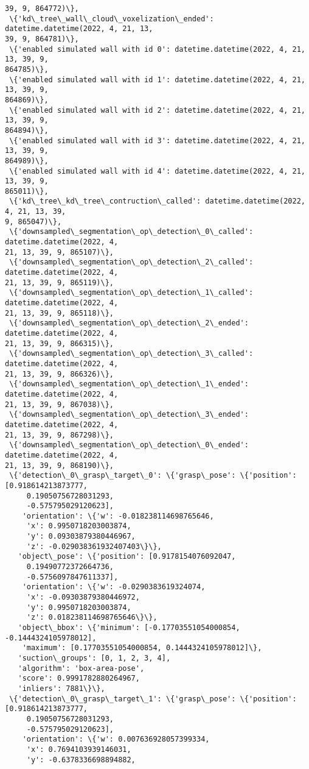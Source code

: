 \documentclass[11pt]{article}
\begin{document}
\begin{tcolorbox}[breakable, size=fbox, boxrule=.5pt, pad at break*=1mm, opacityfill=0]
\begin{Verbatim}[commandchars=\\\{\}]
39, 9, 864772)\},
 \{'kd\_tree\_wall\_cloud\_voxelization\_ended': datetime.datetime(2022, 4, 21, 13,
39, 9, 864781)\},
 \{'enabled simulated wall with id 0': datetime.datetime(2022, 4, 21, 13, 39, 9,
864785)\},
 \{'enabled simulated wall with id 1': datetime.datetime(2022, 4, 21, 13, 39, 9,
864869)\},
 \{'enabled simulated wall with id 2': datetime.datetime(2022, 4, 21, 13, 39, 9,
864894)\},
 \{'enabled simulated wall with id 3': datetime.datetime(2022, 4, 21, 13, 39, 9,
864989)\},
 \{'enabled simulated wall with id 4': datetime.datetime(2022, 4, 21, 13, 39, 9,
865011)\},
 \{'kd\_tree\_kd\_tree\_contruction\_called': datetime.datetime(2022, 4, 21, 13, 39,
9, 865047)\},
 \{'downsampled\_segmentation\_op\_detection\_0\_called': datetime.datetime(2022, 4,
21, 13, 39, 9, 865107)\},
 \{'downsampled\_segmentation\_op\_detection\_2\_called': datetime.datetime(2022, 4,
21, 13, 39, 9, 865119)\},
 \{'downsampled\_segmentation\_op\_detection\_1\_called': datetime.datetime(2022, 4,
21, 13, 39, 9, 865118)\},
 \{'downsampled\_segmentation\_op\_detection\_2\_ended': datetime.datetime(2022, 4,
21, 13, 39, 9, 866315)\},
 \{'downsampled\_segmentation\_op\_detection\_3\_called': datetime.datetime(2022, 4,
21, 13, 39, 9, 866326)\},
 \{'downsampled\_segmentation\_op\_detection\_1\_ended': datetime.datetime(2022, 4,
21, 13, 39, 9, 867038)\},
 \{'downsampled\_segmentation\_op\_detection\_3\_ended': datetime.datetime(2022, 4,
21, 13, 39, 9, 867298)\},
 \{'downsampled\_segmentation\_op\_detection\_0\_ended': datetime.datetime(2022, 4,
21, 13, 39, 9, 868190)\},
 \{'detection\_0\_grasp\_target\_0': \{'grasp\_pose': \{'position': [0.918614213873777,
     0.19050756728031293,
     -0.575795029120623],
    'orientation': \{'w': -0.018238114698765646,
     'x': 0.9950718203003874,
     'y': 0.09303879380446967,
     'z': -0.029038361932407403\}\},
   'object\_pose': \{'position': [0.9178154076092047,
     0.19490772372664736,
     -0.5756097847611337],
    'orientation': \{'w': -0.0290383619324074,
     'x': -0.09303879380446972,
     'y': 0.9950718203003874,
     'z': 0.018238114698765646\}\},
   'object\_bbox': \{'minimum': [-0.17703551054000854, -0.1444324105978012],
    'maximum': [0.17703551054000854, 0.1444324105978012]\},
   'suction\_groups': [0, 1, 2, 3, 4],
   'algorithm': 'box-area-pose',
   'score': 0.9991782880264967,
   'inliers': 7881\}\},
 \{'detection\_0\_grasp\_target\_1': \{'grasp\_pose': \{'position': [0.918614213873777,
     0.19050756728031293,
     -0.575795029120623],
    'orientation': \{'w': 0.007636928057399334,
     'x': 0.7694103939146031,
     'y': -0.6378336698894882,

\end{Verbatim}
\end{tcolorbox}
\end{document}
